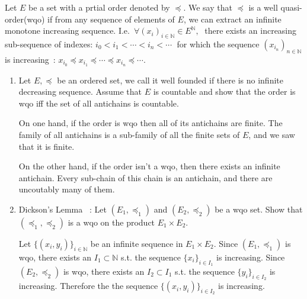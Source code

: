 \documentclass[a4paper,11pt]{exam}
\newcommand{\N}{\mathbb{N}}
\begin{document}
	
	\begin{questions}
		
		\question
		Let $E$ be a set with a prtial order denoted by $\preccurlyeq$.
		We say that $\preccurlyeq$ is a well quasi-order(wqo) if from any sequence of elements of $E$, we can extract an infinite monotone increasing sequence. I.e.\
		$\forall (x_i)_{i\in\N} \in E^{\N}, \; $ there exists an increasing sub-sequence of indexes: $ i_0 < i_1 < \cdots < i_n < \cdots \;$
		for which the sequence $(x_{i_n})_{n\in\N}$ is increasing~:
		$x_{i_0} \preccurlyeq x_{i_1} \preccurlyeq \cdots \preccurlyeq
		x_{i_n}\preccurlyeq \cdots$.		
		\begin{enumerate}
			\item Let $E,\preccurlyeq$ be an ordered set, we call it well founded if there is no infinite decreasing sequence. Assume that $E$ is countable and show that the order is wqo iff the set of all antichains is countable.
			
			\begin{solution}
				On one hand, if the order is wqo then all of its antichains are finite. The family of all antichains is a sub-family of all the finite sets of $E$, and we saw that it is finite.
				
				On the other hand, if the order isn't a wqo, then there exists an infinite antichain. Every sub-chain of this chain is an antichain, and there are uncoutably many of them. 
				
			\end{solution}
			
			\item Dickson's Lemma ~:
			Let $(E_1, \preccurlyeq_1)$  and $(E_2, \preccurlyeq_2)$ be a wqo set.
			Show that $ (\preccurlyeq_1, \preccurlyeq_2) $ is a wqo on the product $E_1\times E_2$. 
			
			\begin{solution}
				Let $\{(x_i,y_i)\}_{i\in\N}$ be an infinite sequence in $E_1\times E_2$. 
				Since $(E_1, \preccurlyeq_1)$ is wqo, there exists an $I_1 \subset \N$ s.t. the sequence $\{x_i\}_{i \in I_1}$ is increasing. Since $(E_2, \preccurlyeq_2)$ is wqo, there exists an $I_2 \subset I_1$ s.t. the sequence $\{y_i\}_{i \in I_2}$ is increasing. Therefore the the sequence $\{(x_i,y_i)\}_{i \in I_2}$ is increasing.
				

\end{solution}
\end{enumerate}
\end{questions}
\end{document}
